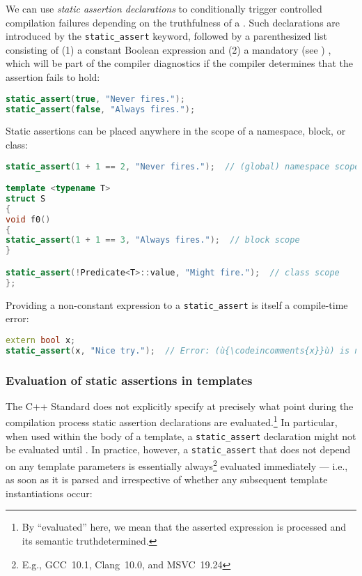 We can use \emph{static assertion declarations} to conditionally trigger
controlled compilation failures depending on the truthfulness of a
. Such declarations are introduced by the
\lstinline!static_assert! keyword, followed by a parenthesized list
consisting of (1) a constant Boolean expression and (2) a mandatory (see
)
, which will be
part of the compiler diagnostics if the compiler determines that the
assertion fails to hold:

\begin{lstlisting}[language=C++]
static_assert(true, "Never fires.");
static_assert(false, "Always fires.");
\end{lstlisting}

\noindent Static assertions can be placed anywhere in the scope of a namespace,
block, or class:

\begin{lstlisting}[language=C++]
static_assert(1 + 1 == 2, "Never fires.");  // (global) namespace scope

template <typename T>
struct S
{
void f0()
{
static_assert(1 + 1 == 3, "Always fires.");  // block scope
}

static_assert(!Predicate<T>::value, "Might fire.");  // class scope
};
\end{lstlisting}

\noindent Providing a non-constant expression to a \lstinline!static_assert! is
itself a compile-time error:

\begin{lstlisting}[language=C++]
extern bool x;
static_assert(x, "Nice try.");  // Error: (ù{\codeincomments{x}}ù) is not a compile-time constant.
\end{lstlisting}


\subsubsection[Evaluation of static assertions in templates]{Evaluation of static assertions in templates}\label{evaluation-of-static-assertions-in-templates}

The C++ Standard does not explicitly specify at precisely what point during
the compilation process static assertion declarations are
evaluated.{\cprotect\footnote{By ``evaluated'' here, we mean that the
asserted expression is processed and its semantic truth\linebreak[4] determined.}}
In particular, when used within the body of a template, a
\lstinline!static_assert! declaration might not be evaluated until
. In practice, however, a
\lstinline!static_assert! that does not depend on any template parameters
is essentially always{\cprotect\footnote{E.g.,
GCC~10.1, Clang~10.0, and MSVC~19.24}} evaluated immediately --- i.e., as
soon as it is parsed and irrespective of whether any subsequent template
instantiations occur:

